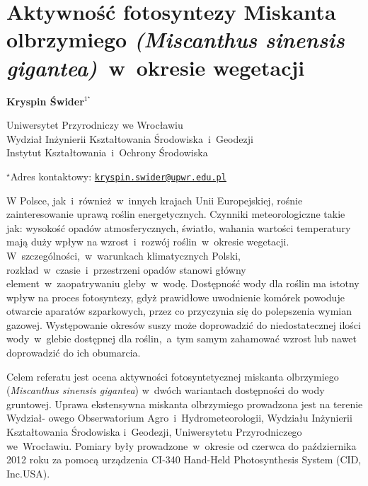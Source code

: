 \documentclass[\main/boa.tex]{subfiles}
\begin{document}
\sloppy


\section{Aktywność fotosyntezy Miskanta olbrzymiego \emph{(Miscanthus sinensis gigantea)}~w~okresie wegetacji}

\begin{center}
  {\bf {} Kryspin \'Swider$^{1^\star}$}
\end{center}

\vskip 0.3cm

\begin{affiliations}
\begin{enumerate}
\begin{minipage}{0.915\textwidth}
\centering
\item  Uniwersytet Przyrodniczy we Wrocławiu\\ Wydział Inżynierii Kształtowania Środowiska~i~Geodezji\\ Instytut Kształtowania~i~Ochrony Środowiska
\end{minipage}
\end{enumerate}
$^\star$Adres kontaktowy: \href{mailto:kryspin.swider@upwr.edu.pl}{\nolinkurl{kryspin.swider@upwr.edu.pl}}\\
\end{affiliations}

\vskip 0.5cm


\vskip 0.5cm

W Polsce, jak~i~również~w~innych krajach Unii Europejskiej, rośnie zainteresowanie uprawą roślin energetycznych. Czynniki meteorologiczne takie jak: wysokość opadów atmosferycznych, światło, wahania wartości temperatury mają duży wpływ na wzrost~i~rozwój roślin~w~okresie wegetacji. W~szczególności,~w~warunkach klimatycznych Polski, rozkład~w~czasie~i~przestrzeni opadów stanowi główny element~w~zaopatrywaniu gleby~w~wodę. Dostępność wody dla roślin ma istotny wpływ na proces fotosyntezy, gdyż prawidłowe uwodnienie komórek powoduje otwarcie aparatów szparkowych, przez co przyczynia się do polepszenia wymian gazowej. Występowanie okresów suszy może doprowadzić do niedostatecznej ilości wody~w~glebie dostępnej dla roślin,~a~tym samym zahamować wzrost lub nawet doprowadzić do ich obumarcia.

Celem referatu jest ocena aktywności fotosyntetycznej miskanta olbrzymiego (\emph{Miscanthus sinensis gigantea}) w~dwóch wariantach dostępności do wody gruntowej. Uprawa ekstensywna miskanta olbrzymiego prowadzona jest na terenie Wydział- owego Obserwatorium Agro~i~Hydrometeorologii, Wydziału Inżynierii Kształtowania Środowiska i~Geodezji, Uniwersytetu Przyrodniczego we~Wrocławiu. Pomiary były prowadzone~w~okresie od czerwca do października 2012 roku za pomocą urządzenia CI-340 Hand-Held Photosynthesis System (CID, Inc.USA). 
\end{document}
